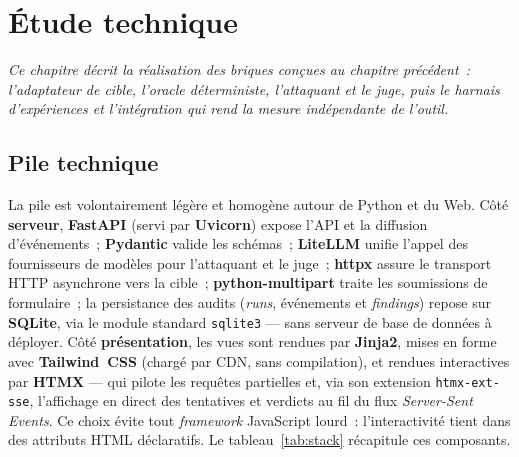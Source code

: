 \chapter{Étude technique}
\label{chap:technique}

\noindent\itshape
Ce chapitre décrit la réalisation des briques conçues au chapitre précédent~: l'adaptateur de cible, l'oracle déterministe, l'attaquant et le juge, puis le harnais d'expériences et l'intégration qui rend la mesure indépendante de l'outil.
\normalfont
\vspace{0.5cm}

\section{Pile technique}

La pile est volontairement légère et homogène autour de Python et du Web. Côté \textbf{serveur}, \textbf{FastAPI} (servi par \textbf{Uvicorn}) expose l'API et la diffusion d'événements~; \textbf{Pydantic} valide les schémas~; \textbf{LiteLLM} unifie l'appel des fournisseurs de modèles pour l'attaquant et le juge~; \textbf{httpx} assure le transport HTTP asynchrone vers la cible~; \textbf{python-multipart} traite les soumissions de formulaire~; la persistance des audits (\emph{runs}, événements et \emph{findings}) repose sur \textbf{SQLite}, via le module standard \texttt{sqlite3} — sans serveur de base de données à déployer. Côté \textbf{présentation}, les vues sont rendues par \textbf{Jinja2}, mises en forme avec \textbf{Tailwind~CSS} (chargé par CDN, sans compilation), et rendues interactives par \textbf{HTMX} — qui pilote les requêtes partielles et, via son extension \texttt{htmx-ext-sse}, l'affichage en direct des tentatives et verdicts au fil du flux \emph{Server-Sent Events}. Ce choix évite tout \emph{framework} JavaScript lourd~: l'interactivité tient dans des attributs HTML déclaratifs. Le tableau~\ref{tab:stack} récapitule ces composants.

